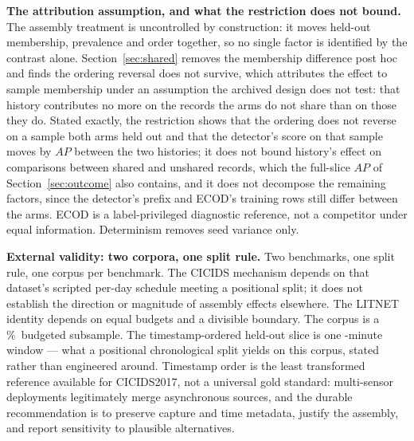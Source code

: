 \documentclass[manuscript,anonymous,review]{acmart}
\begin{document}
\textbf{The attribution assumption, and what the restriction does not
bound.} The assembly treatment is uncontrolled by construction: it moves
held-out membership, prevalence and order together, so no single factor is
identified by the contrast alone. Section~\ref{sec:shared} removes the
membership difference post hoc and finds the ordering reversal does not
survive, which attributes the effect to sample membership under an assumption
the archived design does not test: that history contributes no more on the
records the arms do not share than on those they do. Stated exactly, the
restriction shows that the ordering does not reverse on a sample both arms
held out and that the detector's score on that sample moves by
\RevSharedDetectorSpread{} $AP$ between the two histories; it does not bound
history's effect on comparisons between shared and unshared records, which the
full-slice $AP$ of Section~\ref{sec:outcome} also contains, and it does not
decompose the remaining factors, since the detector's prefix and ECOD's
training rows still differ between the arms. ECOD is a label-privileged
diagnostic reference, not a competitor under equal information. Determinism
removes seed variance only.

\textbf{External validity: two corpora, one split rule.}
Two benchmarks, one split rule, one corpus per benchmark.
The CICIDS mechanism depends on that dataset's scripted per-day schedule
meeting a positional split; it does not establish the direction or magnitude of
assembly effects elsewhere. The LITNET identity depends on equal budgets and a
divisible boundary. The corpus is a \CicidsWeekRetentionPct\%\ budgeted
subsample. The timestamp-ordered held-out slice is one
\CicidsNaturalHeldoutSpanMinutes-minute window --- what a positional
chronological split yields on this corpus, stated rather than engineered
around. Timestamp order is the least transformed reference available for
CICIDS2017, not a universal gold standard: multi-sensor deployments
legitimately merge asynchronous sources, and the durable recommendation is to
preserve capture and time metadata, justify the assembly, and report sensitivity
to plausible alternatives.
\end{document}
